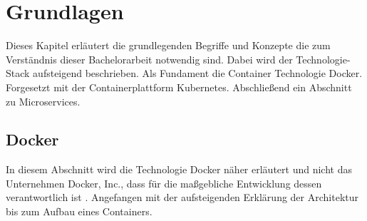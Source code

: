 \chapter{Grundlagen}
Dieses Kapitel erläutert die grundlegenden Begriffe und Konzepte die zum 
Verständnis dieser Bachelorarbeit notwendig sind. 
Dabei wird der Technologie-Stack aufsteigend beschrieben.
Als Fundament die Container Technologie Docker.
Forgesetzt mit der Containerplattform Kubernetes.
Abschließend ein Abschnitt zu Microservices.


\section{Docker} \label{Docker}

In diesem Abschnitt wird die Technologie \glqq Docker\grqq{} näher erläutert und
nicht das Unternehmen \glqq Docker, Inc.\grqq{}, dass für die maßgebliche Entwicklung dessen verantwortlich ist \cite{dockerdeep}.
Angefangen mit der aufsteigenden Erklärung der Architektur bis zum Aufbau eines Containers.


